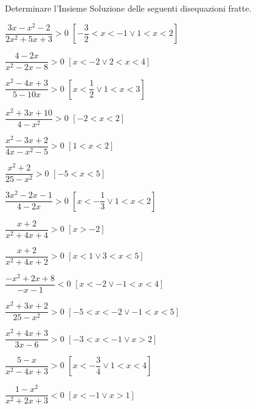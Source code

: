 \begin{esercizio}[*]
 \label{ese:4.61}
Determinare l'Insieme Soluzione delle seguenti disequazioni fratte.
\begin{htmulticols}{2}
\begin{enumeratea}
\item \(\dfrac{3x-x^2-2}{2x^2+5x+3}>0\) \hfill \(\left[-\dfrac 3 2<x<-1\vee 
1<x<2\right]\)
\item \(\dfrac{4-2x}{x^2-2x-8}>0\) \hfill \(\left[x<-2\vee 2<x<4\right]\)
\item \(\dfrac{x^2-4x+3}{5-10x}>0\) \hfill \(\left[x<\dfrac 1 2\vee 
1<x<3\right]\)
\item \(\dfrac{x^2+3x+10}{4-x^2}>0\) \hfill \(\left[-2<x<2\right]\)
\item \(\dfrac{x^2-3x+2}{4x-x^2-5}>0\) \hfill \(\left[1<x<2\right]\)
\item \(\dfrac{x^2+2}{25-x^2}>0\) \hfill \(\left[-5<x<5\right]\)
\item \(\dfrac{3x^2-2x-1}{4-2x}>0\) \hfill \(\left[x<-\dfrac 1 3\vee 
1<x<2\right]\)
\item \(\dfrac{x+2}{x^2+4x+4}>0\) \hfill \(\left[x>-2\right]\)
\item \(\dfrac{x+2}{x^2+4x+2}>0\) \hfill \(\left[x<1\vee 3<x<5\right]\)
\item \(\dfrac{-x^2+2x+8}{-x-1}<0\) \hfill \(\left[x<-2\vee -1<x<4\right]\)
\item \(\dfrac{x^2+3x+2}{25-x^2}>0\) \hfill \(\left[-5<x<-2\vee 
-1<x<5\right]\)
\item \(\dfrac{x^2+4x+3}{3x-6}>0\) \hfill \(\left[-3<x<-1\vee x>2\right]\)
\item \(\dfrac{5-x}{x^2-4x+3}>0\) \hfill \(\left[x<-\dfrac 3 4\vee 
1<x<4\right]\)
\item \(\dfrac{1-x^2}{x^2+2x+3}<0\) \hfill \(\left[x<-1\vee x>1\right]\)
\end{enumeratea}
\end{htmulticols}
\end{esercizio}

\pagebreak %

